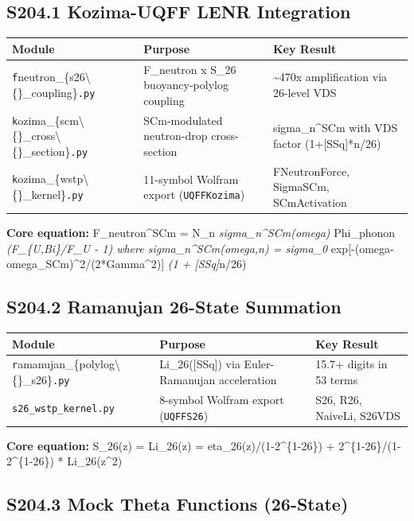 \documentclass[11pt]{article}
\begin{document}
\subsection*{S204.1 Kozima-UQFF LENR Integration}

\begin{center}
\begin{longtable}{lll}
\toprule
Module & Purpose & Key Result \tabularnewline
\midrule
\endhead
\verb|f|neutron\_\{s26\textbackslash\{\}\_coupling\}\verb|.py| & F\_neutron x S\_26 buoyancy-polylog coupling & \textasciitilde{}470x amplification via 26-level VDS \tabularnewline
\verb|k|ozima\_\{scm\textbackslash\{\}\_cross\textbackslash\{\}\_section\}\verb|.py| & SCm-modulated neutron-drop cross-section & sigma\_n\textasciicircum{}SCm with VDS factor (1+[SSq]*n/26) \tabularnewline
\verb|k|ozima\_\{wstp\textbackslash\{\}\_kernel\}\verb|.py| & 11-symbol Wolfram export (\verb|UQFFKozima|) & FNeutronForce, SigmaSCm, SCmActivation \tabularnewline
\bottomrule
\end{longtable}
\end{center}

\textbf{Core equation:} F\_neutron\textasciicircum{}SCm = N\_n \emph{ sigma\_n\textasciicircum{}SCm(omega) } Phi\_phonon \emph{ (F\_\{U,Bi\}/F\_U - 1) where sigma\_n\textasciicircum{}SCm(omega,n) = sigma\_0 } exp[-(omega-omega\_SCm)\textasciicircum{}2/(2*Gamma\textasciicircum{}2)] \emph{ (1 + [SSq]}n/26)

\subsection*{S204.2 Ramanujan 26-State Summation}

\begin{center}
\begin{longtable}{lll}
\toprule
Module & Purpose & Key Result \tabularnewline
\midrule
\endhead
\verb|r|amanujan\_\{polylog\textbackslash\{\}\_s26\}\verb|.py| & Li\_26([SSq]) via Euler-Ramanujan acceleration & 15.7+ digits in 53 terms \tabularnewline
\verb|s26_wstp_kernel.py| & 8-symbol Wolfram export (\verb|UQFFS26|) & S26, R26, NaiveLi, S26VDS \tabularnewline
\bottomrule
\end{longtable}
\end{center}

\textbf{Core equation:} S\_26(z) = Li\_26(z) = eta\_26(z)/(1-2\textasciicircum{}\{1-26\}) + 2\textasciicircum{}\{1-26\}/(1-2\textasciicircum{}\{1-26\}) * Li\_26(z\textasciicircum{}2)

\subsection*{S204.3 Mock Theta Functions (26-State)}
\end{document}
